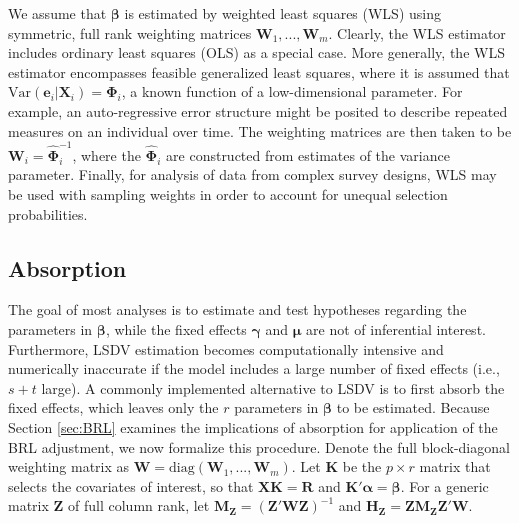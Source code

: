\documentclass[12pt]{article}
\begin{document}
We assume that \(\boldsymbol\beta\) is estimated by weighted least
squares (WLS) using symmetric, full rank weighting matrices
\(\mathbf{W}_1,...,\mathbf{W}_m\). Clearly, the WLS estimator includes
ordinary least squares (OLS) as a special case. More generally, the WLS
estimator encompasses feasible generalized least squares, where it is
assumed that
\(\text{Var}\left(\mathbf{e}_i\left|\mathbf{X}_i\right.\right) = \boldsymbol\Phi_i\),
a known function of a low-dimensional parameter. For example, an
auto-regressive error structure might be posited to describe repeated
measures on an individual over time. The weighting matrices are then
taken to be \(\mathbf{W}_i = \hat{\boldsymbol\Phi}_i^{-1}\), where the
\(\hat{\boldsymbol\Phi}_i\) are constructed from estimates of the
variance parameter. Finally, for analysis of data from complex survey
designs, WLS may be used with sampling weights in order to account for
unequal selection probabilities.

\hypertarget{absorption}{%
\subsection{Absorption}\label{absorption}}

The goal of most analyses is to estimate and test hypotheses regarding
the parameters in \(\boldsymbol\beta\), while the fixed effects
\(\boldsymbol\gamma\) and \(\boldsymbol\mu\) are not of inferential
interest. Furthermore, LSDV estimation becomes computationally intensive
and numerically inaccurate if the model includes a large number of fixed
effects (i.e., \(s + t\) large). A commonly implemented alternative to
LSDV is to first absorb the fixed effects, which leaves only the \(r\)
parameters in \(\boldsymbol\beta\) to be estimated. Because Section
\ref{sec:BRL} examines the implications of absorption for application of
the BRL adjustment, we now formalize this procedure. Denote the full
block-diagonal weighting matrix as
\(\mathbf{W} = \text{diag}\left(\mathbf{W}_1,...,\mathbf{W}_m\right)\).
Let \(\mathbf{K}\) be the \(p \times r\) matrix that selects the
covariates of interest, so that \(\mathbf{X} \mathbf{K} = \mathbf{R}\)
and \(\mathbf{K}'\boldsymbol\alpha = \boldsymbol\beta\). For a generic
matrix \(\mathbf{Z}\) of full column rank, let
\(\mathbf{M_Z} = \left(\mathbf{Z}'\mathbf{W}\mathbf{Z}\right)^{-1}\) and
\(\mathbf{H_Z} = \mathbf{Z}\mathbf{M_Z}\mathbf{Z}'\mathbf{W}\).
\end{document}
